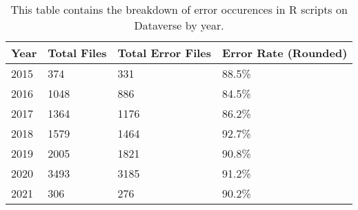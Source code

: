 \begin{table}
\centering
\caption{This table contains the breakdown of error occurences in R scripts on Dataverse by year.}
\label{tab:year-breakdown}
\begin{tabular}{llll}
\toprule
Year & Total Files & Total Error Files & Error Rate (Rounded) \\
\midrule
2015 &         374 &               331 &                88.5\% \\ \hline
2016 &        1048 &               886 &                84.5\% \\ \hline
2017 &        1364 &              1176 &                86.2\% \\ \hline
2018 &        1579 &              1464 &                92.7\% \\ \hline
2019 &        2005 &              1821 &                90.8\% \\ \hline
2020 &        3493 &              3185 &                91.2\% \\ \hline
2021 &         306 &               276 &                90.2\% \\
\bottomrule
\end{tabular}
\end{table}
